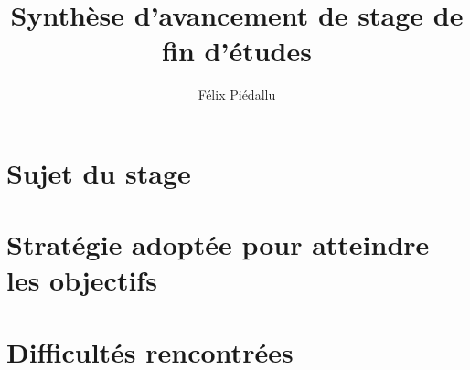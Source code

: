 \documentclass[a4paper,11pt]{article}
\title{Synthèse d'avancement de stage de fin d'études}
\author{Félix Piédallu}
\begin{document}
\maketitle


\section{Sujet du stage}

\section{Stratégie adoptée pour atteindre les objectifs}

\section{Difficultés rencontrées}
\end{document}
